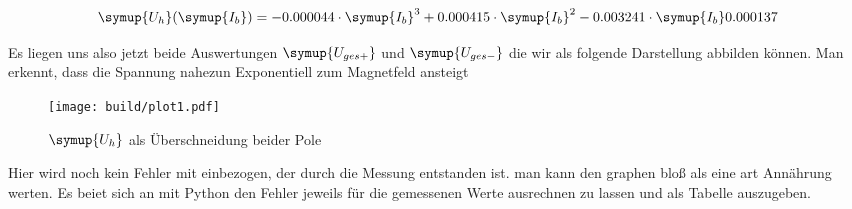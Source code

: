 \begin{equation}
   \symup{U_h}(\symup{I_b})=-0.000044 \cdot \symup{I_b}^3 + 0.000415\cdot\symup{I_b}^2 -0.003241\cdot\symup{I_b} 0.000137
\end{equation}

Es liegen uns also jetzt beide Auswertungen $\symup{U_{ges+}}$ und $\symup{U_{ges-}}$ die wir als folgende Darstellung abbilden können.
Man erkennt, dass die Spannung nahezun Exponentiell zum Magnetfeld ansteigt %

\begin{figure}
   \centering
   \texttt{[image: build/plot1.pdf]}
   \caption{$\symup{U_h}$ als Überschneidung beider Pole}
   \label{fig:auswertunghall}
\end{figure}

Hier wird noch kein Fehler mit einbezogen, der durch die Messung entstanden ist. man kann den graphen bloß als eine art Annährung werten. 
Es beiet sich an mit Python den Fehler jeweils für die gemessenen Werte ausrechnen zu lassen und als Tabelle auszugeben.

%
